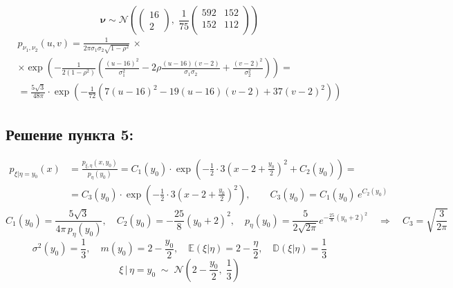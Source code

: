 \documentclass[12pt]{spbstu-task}
\begin{document}
\begin{displaymath}
  \boldsymbol{\nu} \sim \mathcal{N}\left(
    \begin{pmatrix} 16 \\ 2 \end{pmatrix},\;
    \frac{1}{75}\begin{pmatrix}
      592 & 152 \\
      152 & 112 \\
    \end{pmatrix}
  \right)
\end{displaymath}
\begin{gather*}
  p_{\nu_1,\nu_2}(u,v) = \frac{1}{2\pi\sigma_1\sigma_2\sqrt{1 - \rho^2}}\,\times \\
  \times\exp\left(-\frac{1}{2(1 - \rho^2)}\left(\frac{(u - 16)^2}{\sigma_1^2} - 2\rho\frac{(u - 16)(v - 2)}{\sigma_1\sigma_2} + \frac{(v - 2)^2}{\sigma_2^2}\right)\right) = \\
  = \frac{5\sqrt{3}}{48\pi}\cdot\exp\left(-\frac{1}{72}\left(7(u - 16)^2 - 19(u - 16)(v - 2) + 37(v - 2)^2\right)\right)
\end{gather*}
\subsection*{Решение пункта 5:}
\begin{align*}
  p_{\xi|\eta = y_0}(x)
  &= \frac{p_{\xi,\eta}(x, y_0)}{p_{\eta}(y_0)}
  = C_1(y_0)\cdot\exp\left(-\frac{1}{2}\cdot 3\left(x - 2 + \frac{y_0}{2}\right)^2 + C_2(y_0)\right) = \\
  &= C_3(y_0)\cdot\exp\left(-\frac{1}{2}\cdot 3\left(x - 2 + \frac{y_0}{2}\right)^2\right),\qquad
  C_3(y_0) = C_1(y_0)\,e^{C_2(y_0)}
\end{align*}
\begin{displaymath}
  C_1(y_0) = \frac{5\sqrt{3}}{4\pi\,p_\eta(y_0)},\quad
  C_2(y_0) = -\frac{25}{8}(y_0 + 2)^2,\quad
  p_\eta(y_0) = \frac{5}{2\sqrt{2\pi}}e^{-\frac{25}{8}(y_0 + 2)^2}
  \quad\Rightarrow\quad C_3 = \sqrt{\frac{3}{2\pi}}
\end{displaymath}
\begin{displaymath}
  \sigma^2(y_0) = \frac{1}{3},\quad m(y_0) = 2 - \frac{y_0}{2},\quad
  \mathbb{E}(\xi|\eta) = 2 - \frac{\eta}{2},\quad\mathbb{D}(\xi|\eta) = \frac{1}{3}
\end{displaymath}
\begin{displaymath}
  \xi\,|\,\eta = y_0 \;\sim\; \mathcal{N}\left(2 - \frac{y_0}{2},\;\frac{1}{3}\right)
\end{displaymath}
\end{document}
